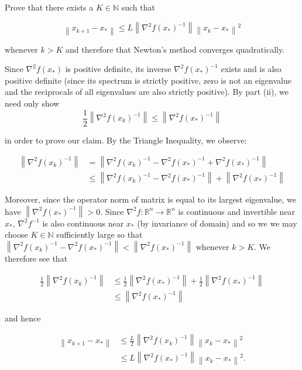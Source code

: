 Prove that there exists a $K \in \mathbb{N}$ such that

$$
\left\lVert x_{k+1} - x_* \right\rVert \le 
    L \left\lVert \nabla^2 f(x_*)^{-1} \right\rVert \left\lVert x_k - x_* \right\rVert^2
$$

whenever $k > K$ and therefore that Newton's method converges quadratically.

\begin{solution}
    Since $\nabla^2 f(x_*)$ is positive definite, its inverse $\nabla^2 f(x_*)^{-1}$ exists and is also positive 
    definite (since its spectrum is strictly positive, zero is not an eigenvalue and the reciprocals of all eigenvalues
    are also strictly positive). By part (ii), we need only show
    $$
        \frac{1}{2} \left\lVert \nabla^2 f(x_k)^{-1} \right\rVert \le \left\lVert \nabla^2 f(x_*)^{-1} \right\rVert
    $$

    in order to prove our claim. By the Triangle Inequality, we observe:

    \begin{align*}
    \left\lVert \nabla^2 f(x_k)^{-1} \right\rVert &= \left\lVert \nabla^2 f(x_k)^{-1} - \nabla^2 f(x_*)^{-1} + \nabla^2 f(x_*)^{-1} \right\rVert \\
                                                  &\le \left\lVert \nabla^2 f(x_k)^{-1} - \nabla^2 f(x_*)^{-1} \right\rVert + \left\lVert \nabla^2 f(x_*)^{-1} \right\rVert 
    \end{align*}

    Moreover, since the operator norm of matrix is equal to its largest eigenvalue, we have 
    $\left\lVert \nabla^2 f(x_*)^{-1} \right\rVert > 0$. Since $\nabla^2 f:\mathbb{R}^n \to \mathbb{R}^n$ is continuous 
    and invertible near $x_*$, $\nabla^2 f^{-1}$ is also continuous near $x_*$ (by invariance of domain) and so we we 
    may choose $K \in \mathbb{N}$ sufficiently large so that 
    $\left\lVert \nabla^2 f(x_k)^{-1} - \nabla^2 f(x_*)^{-1} \right\rVert < \left\lVert \nabla^2 f(x_*)^{-1} \right\rVert$
    whenever $k > K$. We therefore see that 

    \begin{align*}
        \frac{1}{2} \left\lVert \nabla^2 f(x_k)^{-1} \right\rVert &\le \frac{1}{2} \left\lVert \nabla^2 f(x_*)^{-1} \right\rVert + \frac{1}{2} \left\lVert \nabla^2 f(x_*)^{-1} \right\rVert \\
                                                                  &\le \left\lVert \nabla^2 f(x_*)^{-1} \right\rVert
    \end{align*}

    and hence

    \begin{align*}
        \left\lVert x_{k+1} - x_* \right\rVert &\le \frac{L}{2} \left\lVert \nabla^2 f(x_k)^{-1} \right\rVert \left\lVert x_k - x_* \right\rVert^2 \\
                                               &\le L \left\lVert \nabla^2 f(x_*)^{-1} \right\rVert \left\lVert x_k - x_* \right\rVert^2.
    \end{align*}

    \ \\
\end{solution}
